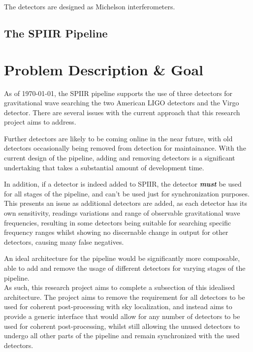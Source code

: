 \documentclass{article}
\begin{document}
The detectors are designed as Michelson interferometers.
%

\subsection{The SPIIR Pipeline}

\section{Problem Description \& Goal}
As of \today{}, the SPIIR pipeline supports the use of three detectors for gravitational wave
searching \textendash{} the two American LIGO detectors and the Virgo detector. There are several
issues with the current approach that this research project aims to address.

Further detectors are likely to be coming online in the near future, with old detectors occasionally
being removed from detection for maintainance. With the current design of the pipeline, adding and
removing detectors is a significant undertaking that takes a substantial amount of development time.

In addition, if a detector is indeed added to SPIIR, the detector \textit{\textbf{must}} be used for
all stages of the pipeline, and can't be used just for synchronization purposes. This presents an
issue as additional detectors are added, as each detector has its own sensitivity, readings
variations and range of observable gravitational wave frequencies, resulting in some detectors being
suitable for searching specific frequency ranges whilst showing no discernable change in output for
other detectors, causing many false negatives.

An ideal architecture for the pipeline would be significantly more composable, able to add and
remove the usage of different detectors for varying stages of the pipeline.
\\

As such, this research project aims to complete a subsection of this idealised architecture. The
project aims to remove the requirement for all detectors to be used for coherent post-processing
with sky localization, and instead aims to provide a generic interface that would allow for any
number of detectors to be used for coherent post-processing, whilst still allowing the unused
detectors to undergo all other parts of the pipeline and remain synchronized with the used
detectors.
\end{document}
